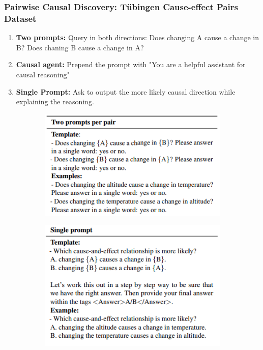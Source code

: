 \documentclass{beamer}
\begin{document}
\begin{frame}
	\frametitle{Pairwise Causal Discovery: T\"{u}bingen Cause-effect Pairs Dataset}
	\begin{enumerate}
		\item \textbf{Two prompts: } Query in both directions: Does changing A cause a change in B? Does chaning B cause a change in A?
		\item \textbf{Causal agent: } Prepend the prompt with "You are a helpful assistant for causal reasoning"
		\item \textbf{Single Prompt: } Ask to output the more likely causal direction while explaining the reasoning.
	\end{enumerate}
	\begin{figure}
		\centering
		\begin{subfigure}{0.5 \textwidth}
			\centering
			\includegraphics[scale=0.4]{imgs/example1.png}
		\end{subfigure}%
		\begin{subfigure}{0.5 \textwidth}
			\centering
			\includegraphics[scale=0.4]{imgs/example2.png}
		\end{subfigure}
	\end{figure}
\end{frame}
\end{document}

